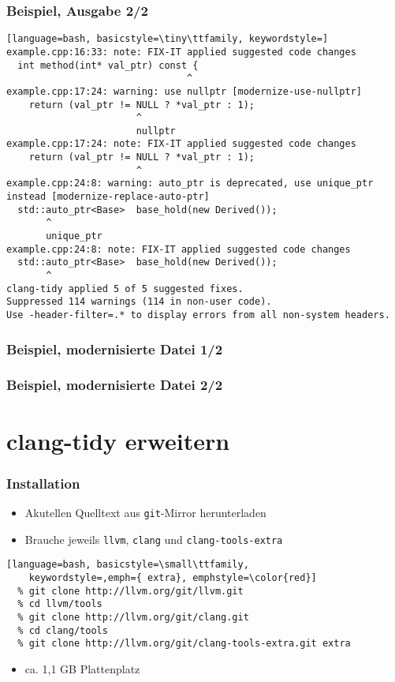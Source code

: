 \documentclass[aspectratio=169]{beamer}
\begin{document}
\begin{frame}[fragile]
  \frametitle{Beispiel, Ausgabe 2/2}
\begin{lstlisting}[language=bash, basicstyle=\tiny\ttfamily, keywordstyle=]
example.cpp:16:33: note: FIX-IT applied suggested code changes
  int method(int* val_ptr) const {
                                ^
example.cpp:17:24: warning: use nullptr [modernize-use-nullptr]
    return (val_ptr != NULL ? *val_ptr : 1);
                       ^
                       nullptr
example.cpp:17:24: note: FIX-IT applied suggested code changes
    return (val_ptr != NULL ? *val_ptr : 1);
                       ^
example.cpp:24:8: warning: auto_ptr is deprecated, use unique_ptr instead [modernize-replace-auto-ptr]
  std::auto_ptr<Base>  base_hold(new Derived());
       ^
       unique_ptr
example.cpp:24:8: note: FIX-IT applied suggested code changes
  std::auto_ptr<Base>  base_hold(new Derived());
       ^
clang-tidy applied 5 of 5 suggested fixes.
Suppressed 114 warnings (114 in non-user code).
Use -header-filter=.* to display errors from all non-system headers. 
\end{lstlisting}
\end{frame}

\begin{frame}[fragile]
  \frametitle{Beispiel, modernisierte Datei 1/2}
  
\end{frame}

\begin{frame}[fragile]
  \frametitle{Beispiel, modernisierte Datei 2/2}
  
\end{frame}
\section{clang-tidy erweitern}

\begin{frame}[fragile]
  \frametitle{Installation}
  \begin{itemize}
  \item Akutellen Quelltext aus \texttt{git}-Mirror herunterladen
  \item Brauche jeweils \texttt{llvm},  \texttt{clang} und \texttt{clang-tools-extra} 
  \end{itemize}
  \begin{lstlisting}[language=bash, basicstyle=\small\ttfamily,
    keywordstyle=,emph={ extra}, emphstyle=\color{red}]
  % git clone http://llvm.org/git/llvm.git
  % cd llvm/tools
  % git clone http://llvm.org/git/clang.git
  % cd clang/tools
  % git clone http://llvm.org/git/clang-tools-extra.git extra
  \end{lstlisting}
  \begin{itemize}
  \item ca. 1,1 GB Plattenplatz
  \end{itemize}
\end{frame}
\end{document}
